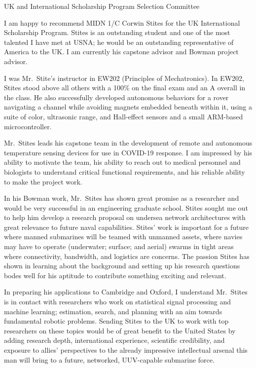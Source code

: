 \documentclass[10pt]{wrceletter}
\date{\today}
\begin{document}
\begin{letter}{%
UK and International Scholarship Program Selection Committee}

\opening{}
\raggedright %
\setlength{\parindent}{15pt} %
I am happy to recommend MIDN 1/C Corwin Stites for the UK International Scholarship Program.  Stites is an outstanding student and one of the most talented I have met at USNA; he would be an outstanding representative of America to the UK. I am currently his capstone advisor and Bowman project advisor. 

I was Mr.~Stite's instructor in EW202 (Principles of Mechatronics).  In EW202, Stites stood above all others with a 100\% on the final exam and an A overall in the class. He also successfully developed autonomous behaviors for a rover navigating a channel while avoiding magnets embedded beneath within it, using a suite of color, ultrasonic range, and Hall-effect sensors and a small ARM-based microcontroller. 

Mr.~Stites leads his capstone team in the development of remote and autonomous temperature sensing devices for use in COVID-19 response. I am impressed by his ability to motivate the team, his ability to reach out to medical personnel and biologists to understand critical functional requirements, and his reliable ability to make the project work. 

In his Bowman work, Mr.~Stites has shown great promise as a researcher and would be very successful in an engineering graduate school. Stites sought me out to help him develop a research proposal on undersea network architectures with great relevance to future naval capabilities. Stites' work is important for a future where manned submarines will be teamed with unmanned assets, where navies may have to operate (underwater; surface; and aerial) swarms in tight areas where connectivity, bandwidth, and logistics are concerns. The passion Stites has shown in learning about the background and setting up his research questions bodes well for his aptitude to contribute something exciting and relevant. 

In preparing his applications to Cambridge and Oxford, I understand Mr.~Stites is in contact with researchers who work on statistical signal processing and machine learning; estimation, search, and planning with an aim towards fundamental robotic problems. Sending Stites to the UK to work with top researchers on these topics would be of great benefit to the United States by adding research depth, international experience, scientific credibility, and exposure to allies' perspectives to the already impressive intellectual arsenal this man will bring to a future, networked, UUV-capable submarine force. 

\closing{~} %

\end{letter}
\end{document}
